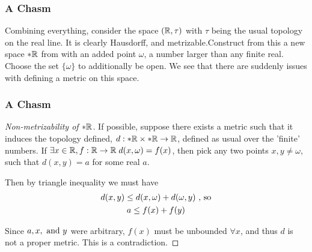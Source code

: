 \begin{frame}
    \frametitle{A Chasm}

    Combining everything, consider the space \((\mathbb{R}, \tau)\) with \(\tau\)
    being the usual topology on the real line. It is clearly Hausdorff, and
    metrizable.\pause Construct from this a new space \(*\mathbb{R}\) from \reals
    with an added point \(\omega\), a number larger than any finite real. Choose
    the set \(\{\omega\}\) to additionally be open. \pause We see that there are
    suddenly issues with defining a metric on this space.

\end{frame}

\begin{frame}
    \frametitle{A Chasm}

    \begin{proof}[Non-metrizability of \(*\mathbb{R}\)]
        If possible, suppose there exists a metric such that it induces the
        topology defined, \(d:*\mathbb{R} \times *\mathbb{R} \to \mathbb{R}\), defined as
        usual over the 'finite' numbers. \pause If \(\exists x \in \mathbb{R},
        f:\mathbb{R} \to \mathbb{R}\; d(x, \omega) = f(x)\), then pick any two points
        \(x, y \not = \omega\), such that \(d(x, y) = a\) for some real \(a\). 
        
        \pause 
        Then by triangle inequality we must have
        \begin{gather*}
            d(x, y) \leq d(x, \omega) + d(\omega, y) \textnormal{ , so} \\
            a \leq f(x) + f(y)
        \end{gather*}

        Since \(a, x, \textnormal{ and } y\) were arbitrary, \(f(x)\) must be
        unbounded \(\forall x\), and thus \(d\) is not a proper metric. This is
        a contradiction. 
    \end{proof}

\end{frame}